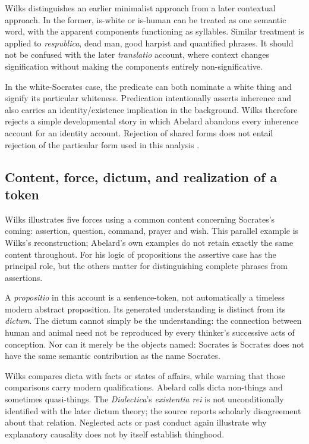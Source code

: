 Wilks distinguishes an earlier minimalist approach from a later
contextual approach. In the former, is-white or is-human can
be treated as one semantic word, with the apparent components
functioning as syllables. Similar treatment is applied to
\emph{respublica}, dead man, good harpist and quantified phrases.
It should not be confused with the later \emph{translatio} account,
where context changes signification without making the components
entirely non-significative.

In the white-Socrates case, the predicate can both nominate a
white thing and signify its particular whiteness.
Predication intentionally asserts inherence and also carries
an identity/existence implication in the background.
Wilks therefore rejects a simple developmental story in which
Abelard abandons every inherence account for an identity account.
Rejection of shared forms does not entail rejection of the
particular form used in this analysis
\cite[pp.~96--101]{Wilks2007FordhamAbelard}.

\subsection{Content, force, dictum, and realization of a token}

Wilks illustrates five forces using a common content concerning
Socrates's coming: assertion, question, command, prayer and wish.
This parallel example is Wilks's reconstruction; Abelard's own
examples do not retain exactly the same content throughout.
For his logic of propositions the assertive case has the
principal role, but the others matter for distinguishing
complete phrases from assertions.

A \emph{propositio} in this account is a sentence-token,
not automatically a timeless modern abstract proposition.
Its generated understanding is distinct from its \emph{dictum}.
The dictum cannot simply be the understanding: the connection
between human and animal need not be reproduced by every
thinker's successive acts of conception.
Nor can it merely be the objects named: Socrates is Socrates
does not have the same semantic contribution as the name Socrates.

Wilks compares dicta with facts or states of affairs, while
warning that those comparisons carry modern qualifications.
Abelard calls dicta non-things and sometimes quasi-things.
The \emph{Dialectica}'s \emph{existentia rei} is not unconditionally
identified with the later dictum theory; the source reports
scholarly disagreement about that relation.
Neglected acts or past conduct again illustrate why explanatory
causality does not by itself establish thinghood.

